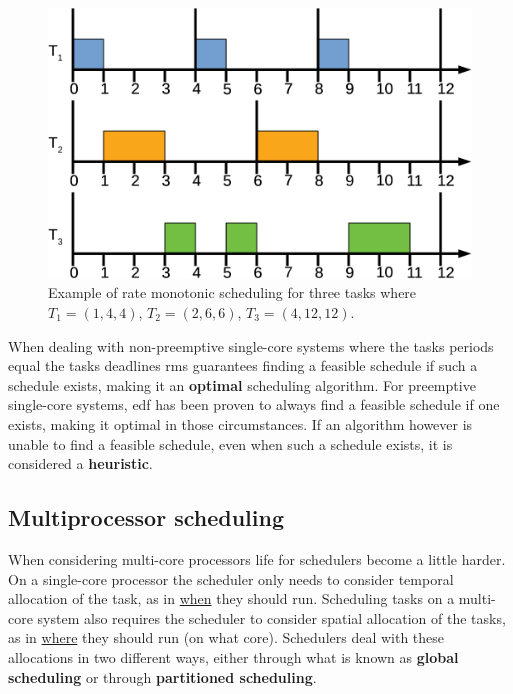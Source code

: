 \documentclass{kththesis}
\begin{document}
\begin{figure}

    \centering

    \includegraphics[width=0.8\linewidth]{images/rate-monotonic-scheduling.pdf}

    \caption{Example of rate monotonic scheduling for three tasks where $T_1=(1, 4, 4)$, $T_2=(2, 6,
    6)$, $T_3=(4, 12, 12)$.}

    \label{fig:rate_monotonic_scheduling}

\end{figure}

When dealing with non-preemptive single-core systems where the tasks periods equal the tasks
deadlines \acrshort{rms} guarantees finding a feasible schedule if such a schedule exists, making it
an \textbf{optimal} scheduling algorithm. For preemptive single-core systems, \acrshort{edf} has
been proven to always find a feasible schedule if one exists, making it optimal in those
circumstances. If an algorithm however is unable to find a feasible schedule, even when such a
schedule exists, it is considered a \textbf{heuristic}.

\subsection{Multiprocessor scheduling} \label{subsec:multiprocessor_scheduling}

When considering multi-core processors life for schedulers become a little harder. On a single-core
processor the scheduler only needs to consider temporal allocation of the task, as in
\underline{when} they should run. Scheduling tasks on a multi-core system also requires the
scheduler to consider spatial allocation of the tasks, as in \underline{where} they should run
(on what core). Schedulers deal with these allocations in two different ways, either through what is
known as \textbf{global scheduling} or through \textbf{partitioned scheduling}. 
\end{document}

